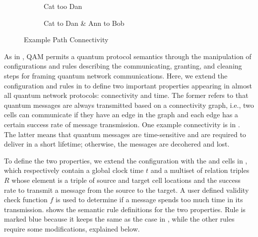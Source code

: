 \begin{figure}[h]
\begin{center}
 \begin{subfigure}[b]{0.4\textwidth}
     \centering
    \caption{Cat too Dan}
    \label{fig:y equals x}
\end{subfigure}
\hfill
 \begin{subfigure}[b]{0.4\textwidth}
     \centering
    \caption{Cat to Dan \& Ann to Bob}
    \label{fig:y equals x}
\end{subfigure}

\end{center}
\caption{Example Path Connectivity }
  \label{fig:examplepath}
\end{figure}
As in , QAM permits a quantum protocol semantics through the manipulation of configurations and rules describing the communicating, granting, and cleaning steps for framing quantum network communications.
Here, we extend the configuration and rules in  to define two important properties appearing in almost all quantum network protocols: connectivity and time.
The former refers to that quantum messages are always transmitted based on a connectivity graph, i.e., two cells can communicate if they have an edge in the graph and each edge has a certain success rate of message transmission. One example connectivity is in .
The latter means that quantum messages are time-sensitive and are required to deliver in a short lifetime; otherwise, the messages are decohered and lost.

To define the two properties, we extend the configuration with the  and  cells in ,
which respectively contain a global clock time $t$ and a multiset of relation triples $R$ whose element is a triple of source and target cell locations and the success rate to transmit a message from the source to the target.
A user defined validity check function $f$ is used to determine if a message spends too much time in its transmission.
 shows the semantic rule definitions for the two properties. Rule  is marked blue because it keeps the same as the case in , while the other rules require some modifications, explained below.
 
